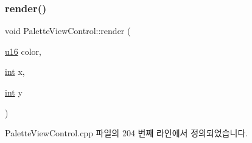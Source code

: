 \subsubsection{\texorpdfstring{render()}{render()}}
{\footnotesize\ttfamily void Palette\+View\+Control\+::render (\begin{DoxyParamCaption}\item[{\mbox{\hyperlink{_system_8h_a9e6c91d77e24643b888dbd1a1a590054}{u16}}}]{color,  }\item[{\mbox{\hyperlink{_util_8cpp_a0ef32aa8672df19503a49fab2d0c8071}{int}}}]{x,  }\item[{\mbox{\hyperlink{_util_8cpp_a0ef32aa8672df19503a49fab2d0c8071}{int}}}]{y }\end{DoxyParamCaption})}



Palette\+View\+Control.\+cpp 파일의 204 번째 라인에서 정의되었습니다.


